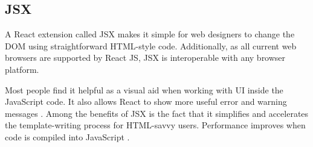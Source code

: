 \subsection{JSX}
\label{jsx}
A React extension called JSX makes it simple for web designers to change the DOM using straightforward HTML-style code. Additionally, as all current web browsers are supported by React JS, JSX is interoperable with any browser platform.

Most people find it helpful as a visual aid when working with UI inside the JavaScript code. It also allows React to show more useful error and warning messages \autocite{react2020introducing}. Among the benefits of JSX is the fact that it simplifies and accelerates the template-writing process for HTML-savvy users. Performance improves when code is compiled into JavaScript \autocite{phan2020react}.

